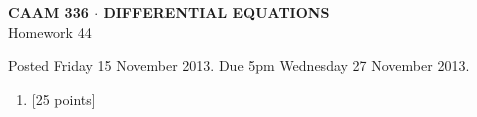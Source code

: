 \documentclass[10pt]{article}
\begin{document}
\vspace*{-5em}
\begin{center}
\large \textsf{\textbf{CAAM 336 $\cdot$ DIFFERENTIAL EQUATIONS}\\[0.5em]
Homework 44 }
\end{center}

Posted Friday 15 November 2013.  Due 5pm Wednesday 27 November 2013.

\begin{enumerate}\addtocounter{enumi}{43}
\item {[25 points]}  
\end{enumerate}
\end{document}
